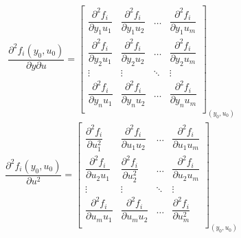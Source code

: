 \documentclass[12pt,a4paper]{article}
\begin{document}
\begin{align}
  \dfrac{\partial^{2} f_{i}(y_{0},u_{0})}{\partial y\partial u} =
  \begin{bmatrix}
    \dfrac{\partial^{2} f_{i}}{\partial y_{1}u_{1}}&\dfrac{\partial^{2} f_{i}}{\partial y_{1}u_{2}}&\ldots&\dfrac{\partial^{2} f_{i}}{\partial y_{1}u_{m}}\\
\dfrac{\partial^{2} f_{i}}{\partial y_{2}u_{1}}&\dfrac{\partial^{2} f_{i}}{\partial y_{2}u_{2}}&\ldots&\dfrac{\partial^{2} f_{i}}{\partial y_{2}u_{m}}\\
    \vdots &\vdots&\ddots&\vdots\\
\dfrac{\partial^{2} f_{i}}{\partial y_{n}u_{1}}&\dfrac{\partial^{2} f_{i}}{\partial y_{n}u_{2}}&\ldots&\dfrac{\partial^{2} f_{i}}{\partial y_{n}u_{m}}\\
  \end{bmatrix}_{(y_{0},u_{0})}
  \label{eq:hessian-yu}
\end{align}
\begin{align}
  \dfrac{\partial^{2} f_{i}(y_{0},u_{0})}{\partial u^{2}} =
  \begin{bmatrix}
    \dfrac{\partial^{2} f_{i}}{\partial u^{2}_{1}}&\dfrac{\partial^{2} f_{i}}{\partial u_{1}u_{2}}&\ldots&\dfrac{\partial^{2} f_{i}}{\partial u_{1}u_{m}}\\
    \dfrac{\partial^{2} f_{i}}{\partial u_{2}u_{1}}&\dfrac{\partial^{2} f_{i}}{\partial u_{2}^{2}}&\ldots&\dfrac{\partial^{2} f_{i}}{\partial u_{2}u_{m}}\\
    \vdots &\vdots&\ddots&\vdots\\
    \dfrac{\partial^{2} f_{i}}{\partial u_{m}u_{1}}&\dfrac{\partial^{2} f_{i}}{\partial u_{m}u_{2}}&\ldots&\dfrac{\partial^{2} f_{i}}{\partial u_{m}^{2}}\\
  \end{bmatrix}_{(y_{0},u_{0})}
  \label{eq:hessian-uu}
\end{align}








\end{document}
